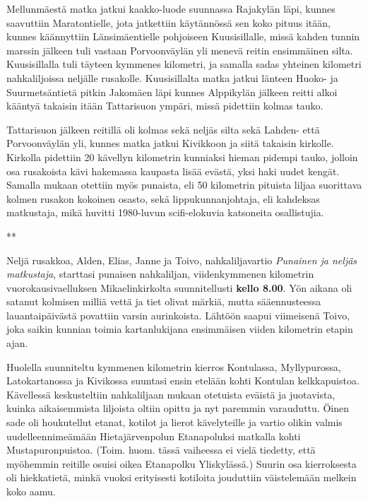 \begin{multicols}{2}
\thispagestyle{empty}

Mellunmäestä matka jatkui kaakko-luode suunnassa Rajakylän läpi, kunnes saavuttiin Maratontielle, jota jatkettiin käytännössä sen koko pituus itään, kunnes käännyttiin Länsimäentielle pohjoiseen Kuusisillalle, missä kahden tunnin marssin jälkeen tuli vastaan Porvoonväylän yli menevä reitin ensimmäinen silta. Kuusisillalla tuli täyteen kymmenes kilometri, ja samalla sadas yhteinen kilometri nahkaliljoissa neljälle rusakolle. Kuusisillalta matka jatkui länteen Huoko- ja Suurmetsäntietä pitkin Jakomäen läpi kunnes Alppikylän jälkeen reitti alkoi kääntyä takaisin itään Tattarisuon ympäri, missä pidettiin kolmas tauko.

Tattarisuon jälkeen reitillä oli kolmas sekä neljäs silta sekä Lahden- että Porvoonväylän yli, kunnes matka jatkui Kivikkoon ja siitä takaisin kirkolle. Kirkolla pidettiin 20 kävellyn kilometrin kunniaksi hieman pidempi tauko, jolloin osa rusakoista kävi hakemassa kaupasta lisää evästä, yksi haki uudet kengät. Samalla mukaan otettiin myös punaista, eli 50 kilometrin pituista liljaa suorittava kolmen rusakon kokoinen osasto, sekä lippukunnanjohtaja, eli kahdeksas matkustaja, mikä huvitti 1980-luvun scifi-elokuvia katsoneita osallistujia.

{\smallskip\noindent\centering ***\par\smallskip}

Neljä rusakkoa, Alden, Elias, Janne ja Toivo, nahkaliljavartio 
\textit{Punainen ja neljäs matkustaja}, starttasi punaisen nahkaliljan, 
viidenkymmenen kilometrin vuorokausivaelluksen Mikaelinkirkolta suunnitellusti 
\textbf{kello 8.00}. Yön aikana oli satanut kolmisen milliä vettä ja tiet 
olivat märkiä, mutta sääennusteessa lauantaipäivästä povattiin varsin 
aurinkoista. Lähtöön saapui viimeisenä Toivo, joka saikin kunnian toimia 
kartanlukijana ensimmäisen viiden kilometrin etapin ajan.

Huolella suunniteltu kymmenen kilometrin kierros Kontulassa, Myllypurossa, 
Latokartanossa ja Kivikossa suuntasi ensin etelään kohti Kontulan 
kelkkapuistoa. Kävellessä keskusteltiin nahkaliljaan mukaan otetuista 
eväistä ja juotavista, kuinka aikaisemmista liljoista oltiin opittu ja nyt 
paremmin varauduttu. Öinen sade oli houkutellut etanat, kotilot ja lierot 
kävelyteille ja vartio olikin valmis uudelleennimeämään Hietajärvenpolun 
Etanapoluksi matkalla kohti Mustapuronpuistoa. (Toim. huom. tässä vaiheessa 
ei vielä tiedetty, että myöhemmin reitille osuisi oikea Etanapolku 
Yliskylässä.) Suurin osa kierroksesta oli hiekkatietä, minkä vuoksi 
erityisesti kotiloita jouduttiin väistelemään melkein koko aamu. 


\end{multicols}
